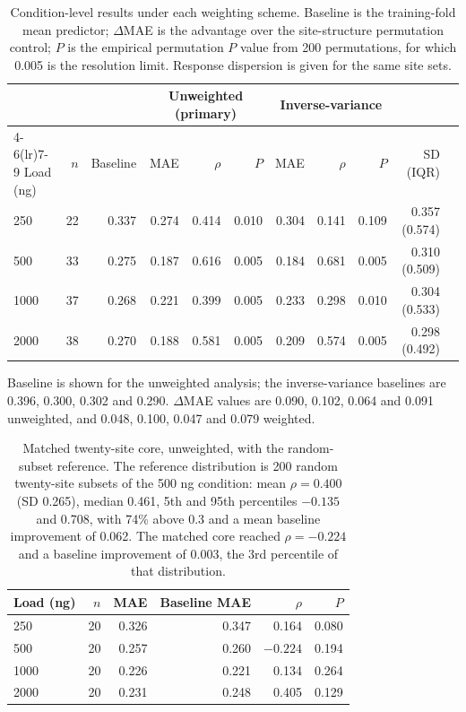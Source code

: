 \documentclass[journal=jprobs,manuscript=article,layout=traditional]{achemso}
\begin{document}
\begin{table}[htbp]
\caption{Condition-level results under each weighting scheme. Baseline is the training-fold mean predictor; $\Delta$MAE is the advantage over the site-structure permutation control; $P$ is the empirical permutation $P$ value from 200 permutations, for which 0.005 is the resolution limit. Response dispersion is given for the same site sets.}
\label{tbl:replication}
\small
\begin{tabular}{lrrrrrrrrrr}
\toprule
 & & & \multicolumn{3}{c}{Unweighted (primary)} & \multicolumn{3}{c}{Inverse-variance} & \\
\cmidrule(lr){4-6}\cmidrule(lr){7-9}
Load (ng) & $n$ & Baseline & MAE & $\rho$ & $P$ & MAE & $\rho$ & $P$ & SD (IQR) \\
\midrule
250  & 22 & 0.337 & 0.274 & 0.414 & 0.010 & 0.304 & 0.141 & 0.109 & 0.357 (0.574) \\
500  & 33 & 0.275 & 0.187 & 0.616 & 0.005 & 0.184 & 0.681 & 0.005 & 0.310 (0.509) \\
1000 & 37 & 0.268 & 0.221 & 0.399 & 0.005 & 0.233 & 0.298 & 0.010 & 0.304 (0.533) \\
2000 & 38 & 0.270 & 0.188 & 0.581 & 0.005 & 0.209 & 0.574 & 0.005 & 0.298 (0.492) \\
\bottomrule
\end{tabular}
\par\smallskip
\footnotesize Baseline is shown for the unweighted analysis; the inverse-variance baselines are 0.396, 0.300, 0.302 and 0.290. $\Delta$MAE values are 0.090, 0.102, 0.064 and 0.091 unweighted, and 0.048, 0.100, 0.047 and 0.079 weighted.
\end{table}

\begin{table}[htbp]
\caption{Matched twenty-site core, unweighted, with the random-subset reference. The reference distribution is 200 random twenty-site subsets of the 500 ng condition: mean $\rho = 0.400$ (SD 0.265), median 0.461, 5th and 95th percentiles $-0.135$ and 0.708, with 74\% above 0.3 and a mean baseline improvement of 0.062. The matched core reached $\rho = -0.224$ and a baseline improvement of 0.003, the 3rd percentile of that distribution.}
\label{tbl:core}
\begin{tabular}{lrrrrr}
\toprule
Load (ng) & $n$ & MAE & Baseline MAE & $\rho$ & $P$ \\
\midrule
250  & 20 & 0.326 & 0.347 & \phantom{-}0.164 & 0.080 \\
500  & 20 & 0.257 & 0.260 & $-0.224$ & 0.194 \\
1000 & 20 & 0.226 & 0.221 & \phantom{-}0.134 & 0.264 \\
2000 & 20 & 0.231 & 0.248 & \phantom{-}0.405 & 0.129 \\
\bottomrule
\end{tabular}
\end{table}
\end{document}
